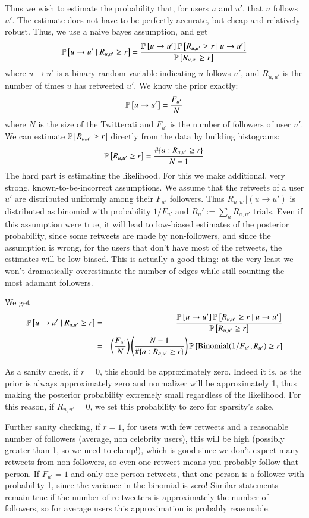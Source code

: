 Thus we wish to estimate the probability that, for users $u$ and $u'$, that $u$ follows $u'$.
The estimate does not have to be perfectly accurate, but cheap and relatively robust.  
Thus, we use a naive bayes assumption, and get
\[\mathbb{P} \left[u\to u'~|~R_{u,u'}\ge r\right] = \frac{\mathbb{P} \left[u\to u'\right]\mathbb{P} \left[R_{u,u'}\ge r~|~u\to u'\right]}{\mathbb{P} \left[R_{u,u'}\ge r\right]}\]
where $u\to u'$ is a binary random variable indicating $u$ follows $u'$, and $R_{u,u'}$ is the number of times $u$ has retweeted $u'$.  
We know the prior exactly:
\[\mathbb{P} \left[u\to u'\right]=\frac{F_{u'}}{N}\]
where $N$ is the size of the Twitterati and $F_{u'}$ is the number of followers of user $u'$.
We can estimate $\mathbb{P} \left[R_{u,u'} \ge r\right]$ directly from the data by building histograms:
\[\mathbb{P} \left[R_{u,u'} \ge r\right]=\frac{\#\{a : R_{a,u'}\ge r\}}{N-1}\]
The hard part is estimating the likelihood.  For this we make additional, very strong, known-to-be-incorrect assumptions.
We assume that the retweets of a user $u'$ are distributed uniformly among their $F_{u'}$ followers.  
Thus $R_{u,u'}|(u\to u')$ is distributed as binomial with probability $1/F_{u'}$ and $R_u':=\sum_a R_{a,u'}$ trials.  
Even if this assumption were true, it will lead to low-biased estimates of the posterior probability, since some retweets are made by non-followers, and since the assumption is wrong, for the users that don't have most of the retweets, the estimates will be low-biased.
This is actually a good thing: at the very least we won't dramatically overestimate the number of edges while still counting the most adamant followers.  

We get
\begin{eqnarray}
  \mathbb{P} \left[u\to u'~|~R_{u,u'}\ge r\right] &=& \frac{\mathbb{P} \left[u\to u'\right]\mathbb{P} \left[R_{u,u'}\ge r~|~u\to u'\right]}{\mathbb{P} \left[R_{u,u'}\ge r\right]}\nonumber\\
  &=& \left(\frac{F_{u'}}{N}\right)\left(\frac{N-1}{\#\{a : R_{a,u'}\ge r\}}\right)\mathbb{P} \left[\mbox{Binomial}(1/F_{u'},R_{u'}) \ge r\right]\label{eq:edgeprob}
\end{eqnarray}

As a sanity check, if $r=0$, this should be approximately zero.
Indeed it is, as the prior is always approximately zero and normalizer will be approximately 1, thus making the posterior probability extremely small regardless of the likelihood.  
For this reason, if $R_{u,u'}=0$, we set this probability to zero for sparsity's sake.  

Further sanity checking, if $r=1$, for users with few retweets and a reasonable number of followers (average, non celebrity users), this will be high (possibly greater than 1, so we need to clamp!), which is good since we don't expect many retweets from non-followers, so even one retweet means you probably follow that person.  
If $F_{u'}=1$ and only one person retweets, that one person is a follower with probability 1, since the variance in the binomial is zero!  Similar statements remain true if the number of re-tweeters is approximately the number of followers, so for average users this approximation is probably reasonable.  

